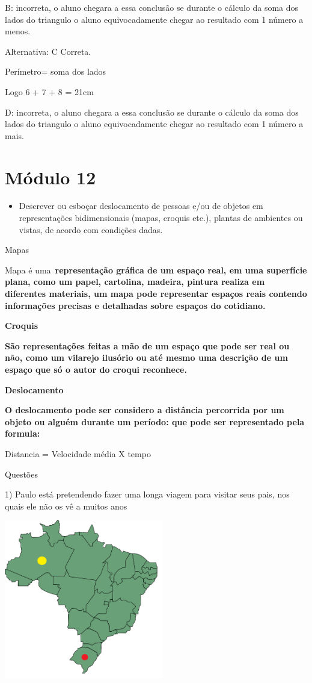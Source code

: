 B: incorreta, o aluno chegara a essa conclusão se durante o cálculo da
soma dos lados do triangulo o aluno equivocadamente chegar ao resultado
com 1 número a menos.

Alternativa: C Correta.

Perímetro= soma dos lados

Logo 6 + 7 + 8 = 21cm

D: incorreta, o aluno chegara a essa conclusão se durante o cálculo da
soma dos lados do triangulo o aluno equivocadamente chegar ao resultado
com 1 número a mais.

\hypertarget{muxf3dulo-12}{%
\section{Módulo 12}\label{muxf3dulo-12}}

\begin{itemize}
\tightlist
\item
  Descrever ou esboçar deslocamento de pessoas e/ou de objetos em
  representações bidimensionais (mapas, croquis etc.), plantas de
  ambientes ou vistas, de acordo com condições dadas.
\end{itemize}

Mapas

Mapa é uma~\textbf{representação gráfica de um espaço real, em uma
superfície plana, como um papel, cartolina, madeira, pintura realiza em
diferentes materiais, um mapa pode representar espaços reais contendo
informações precisas e detalhadas sobre espaços do cotidiano.}

\textbf{Croquis}

\textbf{São representações feitas a mão de um espaço que pode ser real
ou não, como um vilarejo ilusório ou até mesmo uma descrição de um
espaço que só o autor do croqui reconhece.}

\textbf{Deslocamento}

\textbf{O deslocamento pode ser considero a distância percorrida por um
objeto ou alguém durante um período: que pode ser representado pela
formula:}

Distancia = Velocidade média X tempo

Questões

1) Paulo está pretendendo fazer uma longa viagem para visitar seus pais,
nos quais ele não os vê a muitos anos

\includegraphics[width=2.73952in,height=2.725in]{./imgSAEB_8_MAT/media/image36.png}

